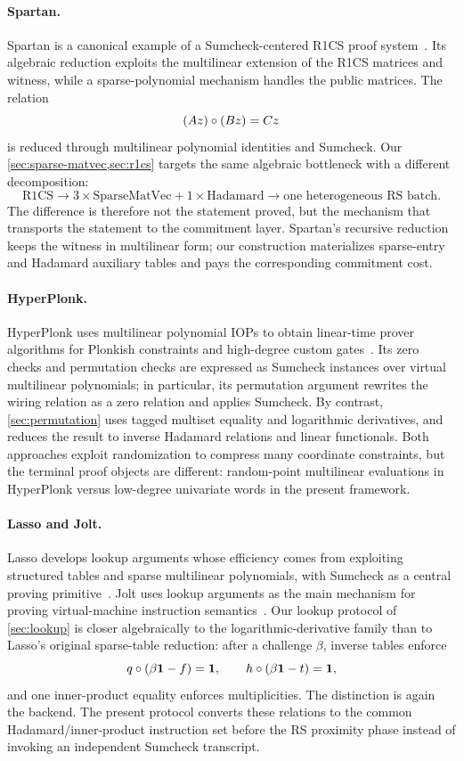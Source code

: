 \paragraph{Spartan.}
Spartan is a canonical example of a Sumcheck-centered R1CS proof system~\cite{Setty20}.  Its algebraic reduction exploits the multilinear extension of the R1CS matrices and witness, while a sparse-polynomial mechanism handles the public matrices.  The relation
\[
  (Az)\circ(Bz)=Cz
\]
is reduced through multilinear polynomial identities and Sumcheck.  Our \cref{sec:sparse-matvec,sec:r1cs} targets the same algebraic bottleneck with a different decomposition:
\[
  \mathrm{R1CS}
  \longrightarrow
  3\times\mathrm{SparseMatVec}
  +1\times\mathrm{Hadamard}
  \longrightarrow
  \text{one heterogeneous RS batch}.
\]
The difference is therefore not the statement proved, but the mechanism that transports the statement to the commitment layer.  Spartan's recursive reduction keeps the witness in multilinear form; our construction materializes sparse-entry and Hadamard auxiliary tables and pays the corresponding commitment cost.

\paragraph{HyperPlonk.}
HyperPlonk uses multilinear polynomial IOPs to obtain linear-time prover algorithms for Plonkish constraints and high-degree custom gates~\cite{HyperPlonk23}.  Its zero checks and permutation checks are expressed as Sumcheck instances over virtual multilinear polynomials; in particular, its permutation argument rewrites the wiring relation as a zero relation and applies Sumcheck.  By contrast, \cref{sec:permutation} uses tagged multiset equality and logarithmic derivatives, and reduces the result to inverse Hadamard relations and linear functionals.  Both approaches exploit randomization to compress many coordinate constraints, but the terminal proof objects are different: random-point multilinear evaluations in HyperPlonk versus low-degree univariate words in the present framework.

\paragraph{Lasso and Jolt.}
Lasso develops lookup arguments whose efficiency comes from exploiting structured tables and sparse multilinear polynomials, with Sumcheck as a central proving primitive~\cite{Lasso23}.  Jolt uses lookup arguments as the main mechanism for proving virtual-machine instruction semantics~\cite{Jolt23}.  Our lookup protocol of \cref{sec:lookup} is closer algebraically to the logarithmic-derivative family than to Lasso's original sparse-table reduction: after a challenge $\beta$, inverse tables enforce
\[
  q\circ(\beta\mathbf 1-f)=\mathbf 1,
  \qquad
  h\circ(\beta\mathbf 1-t)=\mathbf 1,
\]
and one inner-product equality enforces multiplicities.  The distinction is again the backend.  The present protocol converts these relations to the common Hadamard/inner-product instruction set before the RS proximity phase instead of invoking an independent Sumcheck transcript.


